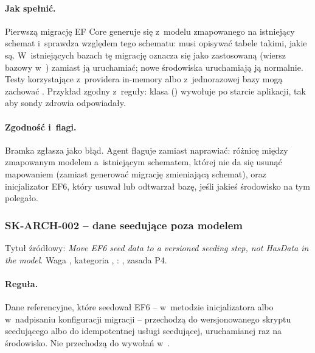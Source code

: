 \paragraph{Jak spełnić.} Pierwszą migrację EF Core generuje się z~modelu zmapowanego na
istniejący schemat i~sprawdza względem tego schematu: musi opisywać tabele takimi, jakie są.
W~istniejących bazach tę migrację oznacza się jako zastosowaną (wiersz bazowy
w~) zamiast ją uruchamiać; nowe środowiska uruchamiają ją
normalnie. Testy korzystające z~providera in-memory albo z~jednorazowej bazy mogą zachować
. Przykład zgodny z~reguły: klasa 
() wywołuje  po
starcie aplikacji, tak aby sondy zdrowia odpowiadały.

\paragraph{Zgodność i~flagi.} Bramka zgłasza 
jako błąd. Agent flaguje zamiast naprawiać: różnicę między zmapowanym modelem a~istniejącym
schematem, której nie da się usunąć mapowaniem (zamiast generować migrację zmieniającą
schemat), oraz inicjalizator EF6, który usuwał lub odtwarzał bazę, jeśli jakieś środowisko
na tym polegało.


\subsubsection{SK-ARCH-002 -- dane seedujące poza modelem}\label{sec:standardy-sk-arch-002}

Tytuł źródłowy: \emph{Move EF6 seed data to a versioned seeding step, not HasData in the
model}. Waga , kategoria , :
, zasada P4.

\paragraph{Reguła.} Dane referencyjne, które seedował EF6 -- w~metodzie 
inicjalizatora albo w~nadpisaniu  konfiguracji migracji -- przechodzą do
wersjonowanego skryptu seedującego albo do idempotentnej usługi seedującej, uruchamianej raz
na środowisko. Nie przechodzą do wywołań  w~.

